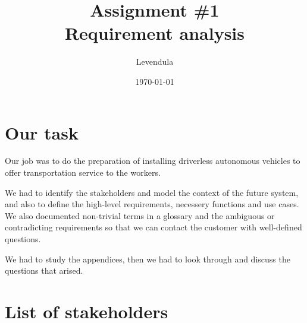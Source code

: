 \documentclass[a4paper]{article}
\title{Assignment \#1 \\ Requirement analysis}
\author{Levendula}
\date{\today}
\begin{document}


\tableofcontents
\clearpage

\section{Our task}



Our job was to do the preparation of installing driverless autonomous vehicles
to offer transportation service to the workers.

We had to identify the stakeholders and model the context of the future system,
and also to define the high-level requirements, necessery functions and use
cases. We also documented non-trivial terms in a glossary and the ambiguous or
contradicting requirements so that we can contact the customer with well-defined
questions.

We had to study the appendices, then we had to look through and discuss the
questions that arised.




\section{List of stakeholders}

%
%
%
%
%
\end{document}
